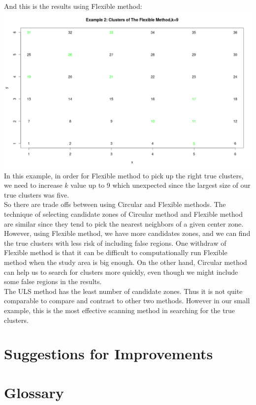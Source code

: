 \documentclass[12pt]{article}
\begin{document}
And this is the results using Flexible method:\\
\includegraphics[scale=0.2]{ex2:Flexible}\\
In this example, in order for Flexible method to pick up the right true clusters, we need to increase $k$ value up to 9 which unexpected since the largest size of our true clusters was five. \\

So there are trade offs between using Circular and Flexible methods. The technique of selecting candidate zones of Circular method and Flexible method are similar since they tend to pick the nearest neighbors of a given center zone. However, using Flexible method, we have more candidates zones, and we can find the true clusters with less risk of including false regions. One withdraw of Flexible method is that it can be difficult to computationally run Flexible method when the study area is big enough. On the other hand, Circular method can help us to search for clusters more quickly, even though we might include some false regions in the results. \\
   
The ULS method has the least number of candidate zones. Thus it is not quite comparable to compare and contrast to other two methods. However in our small example, this is the most effective scanning method in searching for the true clusters. \\



\section{Suggestions for Improvements}
\section{Glossary}
\end{document}
